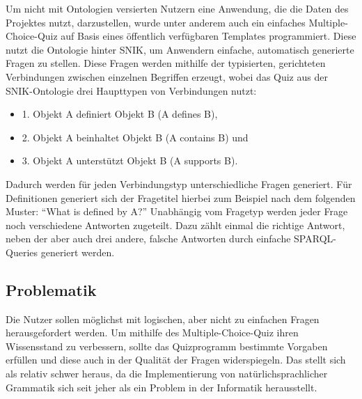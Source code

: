 \documentclass[headsepline,titlepage,ngerman,twoside,12pt]{report}
\newcommand\todo[1]{}%
\begin{document}
Um nicht mit Ontologien versierten Nutzern eine Anwendung, die die Daten des Projektes nutzt, darzustellen, wurde unter anderem auch ein einfaches Multiple-Choice-Quiz auf Basis eines öffentlich verfügbaren Templates programmiert.
Diese nutzt die Ontologie hinter SNIK, um Anwendern einfache, automatisch generierte Fragen zu stellen.
Diese Fragen werden mithilfe der typisierten, gerichteten Verbindungen zwischen einzelnen Begriffen erzeugt, wobei das Quiz aus der SNIK-Ontologie drei Haupttypen von Verbindungen nutzt:
\begin{itemize}
    \item 1. Objekt A definiert Objekt B (A defines B),
    \item 2. Objekt A beinhaltet Objekt B (A contains B) und
    \item 3. Objekt A unterstützt Objekt B (A supports B).
\end{itemize}
Dadurch werden für jeden Verbindungstyp unterschiedliche Fragen generiert.
Für Definitionen generiert sich der Fragetitel hierbei zum Beispiel nach dem folgenden Muster:
\newline \enquote{What is defined by A?}\newline
Unabhängig vom Fragetyp werden jeder Frage noch verschiedene Antworten zugeteilt.
Dazu zählt einmal die richtige Antwort, neben der aber auch drei andere, falsche Antworten durch einfache SPARQL-Queries generiert werden.

\todo{
\begin{itemize}
\item In welcher Welt/Domäne oder welchem Arbeitsbereich/-gebiet bewegen wir uns im Rahmen der Seminararbeit/der ausgewählten Papers?
\item Worum geht es eigentlich?
\end{itemize}
Aus den Papers bzw. dem Antrag des Forschungsprojektes entnehmen.
}

\subsection{Problematik}
\label{sub:Problematik}
\todo{generell im gesamten text: jeden satz auf eine zeile}
Die Nutzer sollen möglichst mit logischen, aber nicht zu einfachen Fragen herausgefordert werden.
Um mithilfe des Multiple-Choice-Quiz ihren Wissensstand zu verbessern, sollte das Quizprogramm bestimmte Vorgaben erfüllen und diese auch in der Qualität der Fragen widerspiegeln.
Das stellt sich als relativ schwer heraus, da die Implementierung von natürlichsprachlicher Grammatik sich seit jeher als ein Problem in der Informatik herausstellt.
\end{document}
